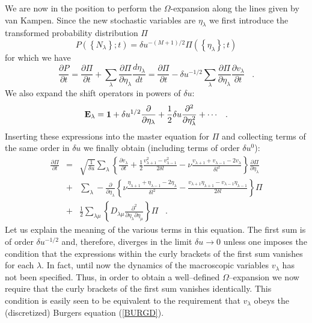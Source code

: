 We are now in the position to perform the $\Omega$-expansion along
the lines given by van Kampen. Since the new stochastic variables are
$\eta_{\lambda}$ we first introduce the transformed
probability distribution $\Pi$
\begin{equation}                                     \label{PI}
P\left( \left\{N_{\lambda} \right\};t \right) =
 \delta u^{-(M+1)/2}
   \Pi \left( \left\{ \eta_{\lambda} \right\};t \right)
\end{equation}
for which we have
\begin{equation}
\frac{\partial P}{\partial t} = \frac{\partial \Pi}{\partial t}
          +\sum_{\lambda} \frac{\partial \Pi}{\partial {\eta}_{\lambda}}
                          \frac{d {\eta}_{\lambda}}{dt} 
= \frac{\partial \Pi}{\partial t} -\delta u^{-1/2}
          \sum_{\lambda} \frac{\partial \Pi}{\partial {\eta}_{\lambda}}
                          \frac{\partial {v}_{\lambda}}{\partial t} 
\;\;\; .
\end{equation}
We also expand the shift operators in powers of $\delta u$:
\begin{equation}
{\bf{E}}_{\lambda}
      = {\bf{1}} + \delta u^{1/2} \frac{\partial}{\partial {\eta}_{\lambda}}
              +\frac{1}{2} \delta u \frac{{\partial}^2}
          {\partial {\eta}^2_{\lambda}} + \cdots \;\;\; .
\end{equation}
Inserting these expressions into the master equation for $\Pi$ and collecting
terms of the same order in $\delta u$ we finally obtain (including terms of 
order $\delta u^0$):
\begin{eqnarray}
\label{OMEGAEX}
\frac{\partial \Pi}{\partial t} &=&
\sqrt{\frac{1}{\delta u}} \sum_{\lambda}
\left\{ \frac{\partial v_{\lambda}}{\partial t} + \frac{1}{2}
        \frac{v_{\lambda +1}^{2} - v_{\lambda -1}^{2}}{2\delta l} -
        \nu \frac{v_{\lambda +1} +
        v_{\lambda -1} - 2v_{\lambda}}{\delta l^{2}}
               \right\}
        \frac{\partial \Pi}{\partial \eta_{\lambda}}
  \nonumber \\
&+& \sum_{\lambda}  -\frac{\partial}{\partial \eta_{\lambda}}
   \left\{
\nu
\frac{\eta_{\lambda +1} + \eta_{\lambda -1} -2 \eta_{\lambda}}{\delta l^2}
- \frac{v_{\lambda +1} \eta_{\lambda +1} - v_{\lambda -1} \eta_{\lambda -1}}
{2 \delta l}  \right\} \Pi  \nonumber \\
&+& \frac{1}{2} \sum_{\lambda \mu} \left\{
D_{\lambda \mu} \frac{\partial^{2}}{\partial\eta_{\lambda}\partial \eta_{\mu}}
\right\} \Pi       \;\;\; .
\end{eqnarray}
Let us explain the meaning of the various terms in this equation.
The first sum is of order $\delta u^{-1/2}$
and, therefore, diverges in the limit $\delta u \longrightarrow 0$ unless
one imposes the condition that the expressions within the curly brackets of
the first sum vanishes for each $\lambda$. In fact, until now the dynamics
of the macroscopic variables $v_{\lambda}$ has not been
specified.
Thus, in order to obtain a well--defined $\Omega$--expansion we now require
that the curly brackets of the first sum vanishes identically. This
condition is easily seen to be equivalent to the requirement that $v_{\lambda}$
obeys the (discretized) Burgers equation (\ref{BURGD}).

